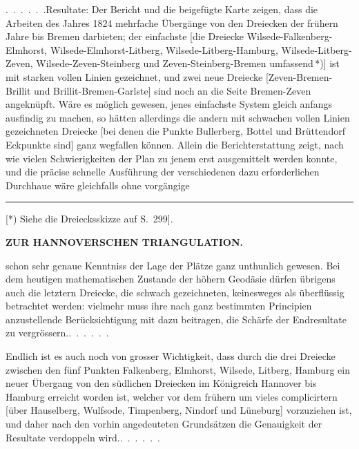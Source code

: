 \par\noindent\hspace*{\parindent}\mbox{.\ .\ .\ .\ .\ .}\quad Resultate: Der Bericht und die beigefügte Karte zeigen, dass
die Arbeiten des Jahres 1824 mehrfache Übergänge von den Dreiecken der
frühern Jahre bis Bremen darbieten; der einfachste [die Dreiecke Wilsede-Falkenberg-Elmhorst,
Wilsede-Elmhorst-Litberg, Wilsede-Litberg-Hamburg,
Wilsede-Litberg-Zeven, Wilsede-Zeven-Steinberg und Zeven-Steinberg-Bremen
umfassend\,*)] ist mit starken vollen Linien gezeichnet, und zwei neue Dreiecke
[Zeven-Bremen-Brillit und Brillit-Bremen-Garlste] sind noch an die Seite
Bremen-Zeven angeknüpft. Wäre es möglich gewesen, jenes einfachste System
gleich anfangs ausfindig zu machen, so hätten allerdings die andern mit
schwachen vollen Linien gezeichneten Dreiecke [bei denen die Punkte Bullerberg,
Bottel und Brüttendorf Eckpunkte sind] ganz wegfallen können. Allein
die Berichterstattung zeigt, nach wie vielen Schwierigkeiten der Plan zu jenem
erst ausgemittelt werden konnte, und die präcise schnelle Ausführung der
verschiedenen dazu erforderlichen Durchhaue wäre gleichfalls ohne vorgängige
\par\vfill\noindent\rule{0.25\linewidth}{0.4pt}\par\smallskip
{\footnotesize\noindent\hspace*{\parindent}[*) Siehe die Dreiecksskizze auf S.~299].\par}
\clearpage
\noindent\null\hfill{\small\textbf{ZUR HANNOVERSCHEN TRIANGULATION.}}\hfill{}\par\medskip
\noindent schon sehr genaue Kenntniss der Lage der Plätze ganz unthunlich gewesen.
Bei dem heutigen mathematischen Zustande der höhern Geodäsie dürfen übrigens
auch die letztern Dreiecke, die schwach gezeichneten, keinesweges als
überflüssig betrachtet werden: vielmehr muss ihre nach ganz bestimmten Principien
anzustellende Berücksichtigung mit dazu beitragen, die Schärfe der Endresultate
zu vergrössern.\quad\mbox{.\ .\ .\ .\ .\ .}

Endlich ist es auch noch von grosser Wichtigkeit, dass durch die drei
Dreiecke zwischen den fünf Punkten Falkenberg, Elmhorst, Wilsede, Litberg,
Hamburg ein neuer Übergang von den südlichen Dreiecken im Königreich
Hannover bis Hamburg erreicht worden ist, welcher vor dem frühern um
vieles complicirtern [über Hauselberg, Wulfsode, Timpenberg, Nindorf und
Lüneburg] vorzuziehen ist, und daher nach den vorhin angedeuteten Grundsätzen
die Genauigkeit der Resultate verdoppeln wird.\quad\mbox{.\ .\ .\ .\ .\ .}

